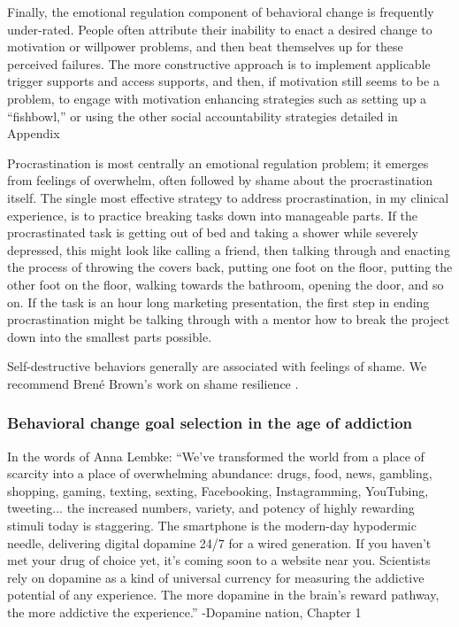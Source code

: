 \documentclass[12pt,letterpaper]{book}
\begin{document}
Finally, the emotional regulation component of behavioral change is frequently under-rated. People often attribute their inability to enact a desired change to motivation or willpower problems, and then beat themselves up for these perceived failures. The more constructive approach is to implement applicable trigger supports and access supports, and then, if motivation still seems to be a problem, to engage with motivation enhancing strategies such as setting up a “fishbowl,” or using the other social accountability strategies detailed in Appendix \todo{}

Procrastination is most centrally an emotional regulation problem; it emerges from feelings of overwhelm, often followed by shame about the procrastination itself. The single most effective strategy to address procrastination, in my clinical experience, is to practice breaking tasks down into manageable parts. If the procrastinated task is getting out of bed and taking a shower while severely depressed, this might look like calling a friend, then talking through and enacting the process of throwing the covers back, putting one foot on the floor, putting the other foot on the floor, walking towards the bathroom, opening the door, and so on. If the task is an hour long marketing presentation, the first step in ending procrastination might be talking through with a mentor how to break the project down into the smallest parts possible.

Self-destructive behaviors generally are associated with feelings of shame. We recommend Brené Brown's work on shame resilience \cite{brownThought}.

\subsubsection*{Behavioral change goal selection in the age of addiction}

In the words of Anna Lembke: “We've transformed the world from a place of scarcity into a place of overwhelming abundance: drugs, food, news, gambling, shopping, gaming, texting, sexting, Facebooking, Instagramming, YouTubing, tweeting... the increased numbers, variety, and potency of highly rewarding stimuli today is staggering. The smartphone is the modern-day hypodermic needle, delivering digital dopamine 24/7 for a wired generation. If you haven't met your drug of choice yet, it's coming soon to a website near you. Scientists rely on dopamine as a kind of universal currency for measuring the addictive potential of any experience. The more dopamine in the brain's reward pathway, the more addictive the experience.” -Dopamine nation, Chapter 1
\end{document}
